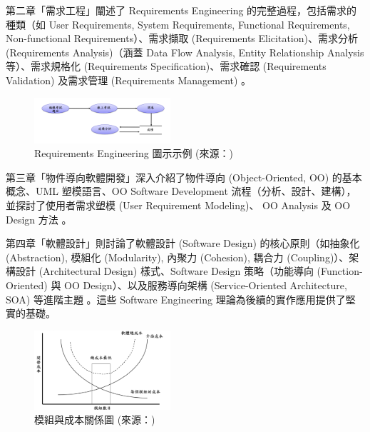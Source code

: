 \documentclass[twocolumn,11pt,a4paper]{article}
\begin{document}
第二章「需求工程」闡述了 Requirements Engineering 的完整過程，包括需求的種類（如 User Requirements, System Requirements, Functional Requirements, Non-functional Requirements）、需求擷取 (Requirements Elicitation)、需求分析 (Requirements Analysis)（涵蓋 Data Flow Analysis, Entity Relationship Analysis 等）、需求規格化 (Requirements Specification)、需求確認 (Requirements Validation) 及需求管理 (Requirements Management) \cite{li2013ch2}。
\begin{figure}[htbp]
    \centering
    \includegraphics[width=0.45\textwidth]{res/image/DFD.png} %
    \caption{Requirements Engineering 圖示示例 (來源：\cite{li2013ch2})}
    \label{fig:textbook_ch2_fig}
\end{figure}
\FloatBarrier

第三章「物件導向軟體開發」深入介紹了物件導向 (Object-Oriented, OO) 的基本概念、UML 塑模語言、OO Software Development 流程（分析、設計、建構），
並探討了使用者需求塑模 (User Requirement Modeling)、
OO Analysis 及 OO Design 方法 \cite{li2013ch3}。


第四章「軟體設計」則討論了軟體設計 (Software Design) 
的核心原則（如抽象化 (Abstraction), 模組化 (Modularity), 
內聚力 (Cohesion), 耦合力 (Coupling)）、架構設計 (Architectural Design) 
樣式、Software Design 策略（功能導向 (Function-Oriented) 
與 OO Design）、以及服務導向架構 (Service-Oriented Architecture, SOA) 
等進階主題 \cite{li2013ch4}。這些 Software Engineering 理論為後續的實作應用提供了堅實的基礎。

\begin{figure}[htbp]
    \centering
    \includegraphics[width=0.45\textwidth]{res/image/model_and_price.png}
    \caption{模組與成本關係圖 (來源：\cite{li2013ch4})}
    \label{fig:model_and_price}
\end{figure}
\FloatBarrier
\end{document}

